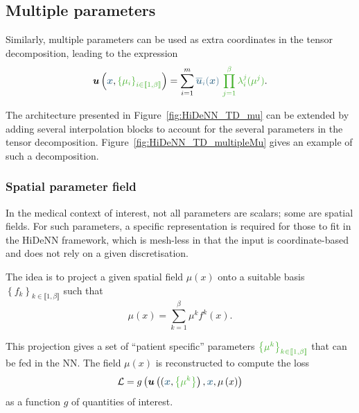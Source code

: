 \subsection{Multiple parameters}

Similarly, multiple parameters can be used as extra coordinates in the tensor decomposition, leading to the expression 
    \begin{equation}
        \vect{u}\left(\textcolor{BleuLMS!70}{\vect{x}}, \textcolor{LGreenLMS}{\left\{\mu_i\right\}_{i \in \llbracket 1, \beta \rrbracket}}\right) = \sum\limits_{i=1}^m \textcolor{BleuLMS!70}{\overline{\vect{u}}_i(\vect{x})} ~\textcolor{LGreenLMS}{\prod_{j=1}^{\beta}\lambda_i^j(\mu^j)}.
    \end{equation}

The architecture presented in Figure~\ref{fig:HiDeNN_TD_mu} can be extended by adding several interpolation blocks to account for the several parameters in the tensor decomposition. Figure~\ref{fig:HiDeNN_TD_multipleMu} gives an example of such a decomposition.

\subsubsection{Spatial parameter field}
\label{sec:SpatialParameters}
In the medical context of interest, not all parameters are scalars; some are spatial fields. For such parameters, a specific representation is required for those to fit in the HiDeNN framework, which is mesh-less in that the input is coordinate-based and does not rely on a given discretisation. 

The idea is to project a given spatial field $\mu\left(x\right)$ onto a suitable basis $\left\{f_k\right\}_{k \in \llbracket 1, \beta \rrbracket}$ such that 
\begin{equation}
    \mu\left(x\right) = \sum\limits_{k=1}^{\beta}\mu^{k}f^k\left(x\right).
\end{equation}

This projection gives a set of ``patient specific'' parameters $\textcolor{LGreenLMS}{\left\{\mu^k\right\}_{k \in \llbracket 1, \beta \rrbracket}}$ that can be fed in the NN. The field $\mu\left(x\right)$ is reconstructed to compute the loss 
\begin{equation}
\mathcal{L} = g\left(\vect{u}\left((\textcolor{BleuLMS!70}{\vect{x}},\textcolor{LGreenLMS}{\left\{\mu^k\right\}}\right),\textcolor{BleuLMS!70}{\vect{x}},\mu\left(x\right)\right)
\end{equation}
as a function $g$ of quantities of interest.
